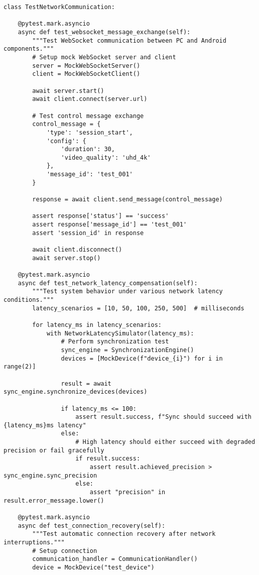 \documentclass[12pt,a4paper]{report}
\begin{document}
\begin{verbatim}
class TestNetworkCommunication:

    @pytest.mark.asyncio
    async def test_websocket_message_exchange(self):
        """Test WebSocket communication between PC and Android components."""
        # Setup mock WebSocket server and client
        server = MockWebSocketServer()
        client = MockWebSocketClient()

        await server.start()
        await client.connect(server.url)

        # Test control message exchange
        control_message = {
            'type': 'session_start',
            'config': {
                'duration': 30,
                'video_quality': 'uhd_4k'
            },
            'message_id': 'test_001'
        }

        response = await client.send_message(control_message)

        assert response['status'] == 'success'
        assert response['message_id'] == 'test_001'
        assert 'session_id' in response

        await client.disconnect()
        await server.stop()

    @pytest.mark.asyncio
    async def test_network_latency_compensation(self):
        """Test system behavior under various network latency conditions."""
        latency_scenarios = [10, 50, 100, 250, 500]  # milliseconds

        for latency_ms in latency_scenarios:
            with NetworkLatencySimulator(latency_ms):
                # Perform synchronization test
                sync_engine = SynchronizationEngine()
                devices = [MockDevice(f"device_{i}") for i in range(2)]

                result = await sync_engine.synchronize_devices(devices)

                if latency_ms <= 100:
                    assert result.success, f"Sync should succeed with {latency_ms}ms latency"
                else:
                    # High latency should either succeed with degraded precision or fail gracefully
                    if result.success:
                        assert result.achieved_precision > sync_engine.sync_precision
                    else:
                        assert "precision" in result.error_message.lower()

    @pytest.mark.asyncio
    async def test_connection_recovery(self):
        """Test automatic connection recovery after network interruptions."""
        # Setup connection
        communication_handler = CommunicationHandler()
        device = MockDevice("test_device")


\end{verbatim}
\end{document}
